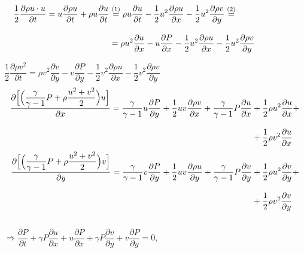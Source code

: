 \documentclass[12pt,a4paper]{article}
\newcommand{\dhalf}{\dfrac{1}{2}}
\newcommand{\dpartial}[2]{\dfrac{ \partial #1 }{ \partial #2 }}
\begin{document}
\begin{enumerate}
            \[
                \hspace*{-1.75cm} \begin{split}
                    \dhalf \dpartial{\rho u \cdot u}{t} = u \dpartial{\rho u}{t} + \rho u \dpartial{u}{t} &\overset{(1)}{=} \rho u \dpartial{u}{t} - \dhalf u^2 \dpartial{\rho u}{x} - \dhalf u^2 \dpartial{\rho v}{y} \overset{(2)}{=} \\[3mm]
                    &= \rho u^2 \dpartial{u}{x} - u \dpartial{P}{x} - \dhalf u^2 \dpartial{\rho u}{x} - \dhalf u^ 2\dpartial{\rho v}{y}
                \end{split}  
            \]

            $ \dhalf \dpartial{\rho v^2}{t} = \rho v^2 \dpartial{v}{y} - v \dpartial{P}{y} - \dhalf v^2 \dpartial{\rho u}{x} - \dhalf v^2 \dpartial{\rho v}{y} $ \\[4mm]
            \[
                \begin{split}
                    \dpartial{\Bigl[ \Bigl( \dfrac{\gamma}{\gamma - 1} P + \rho \dfrac{u^2 + v^2}{2} \Bigr) u \Bigr]}{x} = \dfrac{\gamma}{\gamma - 1} u \dpartial{P}{y} + \dhalf u v \dpartial{\rho v}{x} + \dfrac{\gamma}{\gamma - 1} P \dpartial{u}{x} &+ \dhalf \rho u^2 \dpartial{u}{x} + \\[3mm]
                    &+ \dhalf \rho v^2 \dpartial{u}{x}
                \end{split}  
            \]
            \[
                \begin{split}
                    \dpartial{\Bigl[ \Bigl( \dfrac{\gamma}{\gamma - 1} P + \rho \dfrac{u^2 + v^2}{2} \Bigr) v \Bigr]}{y} = \dfrac{\gamma}{\gamma - 1} v \dpartial{P}{y} + \dhalf u v \dpartial{\rho u}{y} + \dfrac{\gamma}{\gamma - 1} P \dpartial{v}{y} &+ \dhalf \rho u^2 \dpartial{v}{y} + \\[3mm]
                    &+ \dhalf \rho v^2 \dpartial{v}{y}
                \end{split}  
            \] \\[3mm]
            $ \Rightarrow \dpartial{P}{t} + \gamma P \dpartial{u}{x} + u \dpartial{P}{x} + \gamma P \dpartial{v}{y} + v \dpartial{P}{y} = 0, $
        \end{enumerate}
\end{document}

